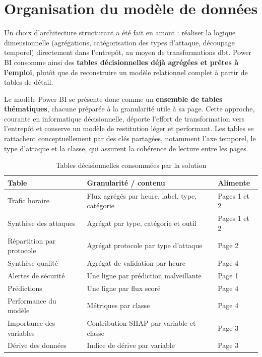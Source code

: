 \documentclass[12pt,a4paper,oneside]{report}
\begin{document}
\section{Organisation du modèle de données}
Un choix d'architecture structurant a été fait en amont : réaliser la logique dimensionnelle (agrégations, catégorisation des types d'attaque, découpage temporel) directement dans l'entrepôt, au moyen de transformations dbt. Power BI consomme ainsi des \textbf{tables décisionnelles déjà agrégées et prêtes à l'emploi}, plutôt que de reconstruire un modèle relationnel complet à partir de tables de détail.

Le modèle Power BI se présente donc comme un \textbf{ensemble de tables thématiques}, chacune préparée à la granularité utile à sa page. Cette approche, courante en informatique décisionnelle, déporte l'effort de transformation vers l'entrepôt et conserve un modèle de restitution léger et performant. Les tables se rattachent conceptuellement par des clés partagées, notamment l'axe temporel, le type d'attaque et la classe, qui assurent la cohérence de lecture entre les pages.

\begin{table}[h]
\centering
\caption{Tables décisionnelles consommées par la solution}
\begin{tabularx}{\textwidth}{l X l}
\toprule
\textbf{Table} & \textbf{Granularité / contenu} & \textbf{Alimente} \\
\midrule
Trafic horaire & Flux agrégés par heure, label, type, catégorie & Pages 1 et 2 \\
Synthèse des attaques & Agrégat par type, catégorie et outil & Pages 1 et 2 \\
Répartition par protocole & Agrégat protocole par type d'attaque & Page 2 \\
Synthèse qualité & Agrégat de validation par heure & Page 4 \\
Alertes de sécurité & Une ligne par prédiction malveillante & Page 1 \\
Prédictions & Une ligne par flux scoré & Page 4 \\
Performance du modèle & Métriques par classe & Page 4 \\
Importance des variables & Contribution SHAP par variable et classe & Page 3 \\
Dérive des données & Indice de dérive par variable & Page 3 \\
\bottomrule
\end{tabularx}
\end{table}
\end{document}
